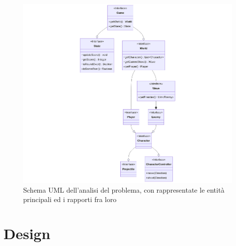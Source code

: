 \documentclass[a4paper,12pt]{report}
\begin{document}
\begin{figure}[H]
\centering{}
\includegraphics[width=1\textwidth]{img/Schema-UML-Analisi.png}
\caption{Schema UML dell'analisi del problema, con rappresentate le entità principali ed i rapporti fra loro}
\label{img:analysis}
\end{figure}




\chapter{Design}
\end{document}
